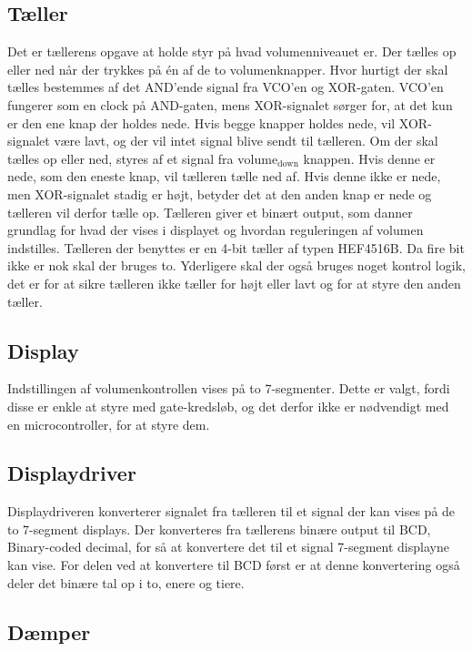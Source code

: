 \subsection*{Tæller}
\label{volumenkontrol-simulering-taeller}

Det er tællerens opgave at holde styr på hvad volumenniveauet er. Der tælles op eller ned når der trykkes på én af de to volumenknapper. Hvor hurtigt der skal tælles bestemmes af det AND'ende signal fra VCO'en og XOR-gaten. VCO'en fungerer som en clock på AND-gaten, mens XOR-signalet sørger for, at det kun er den ene knap der holdes nede. Hvis begge knapper holdes nede, vil XOR-signalet være lavt, og der vil intet signal blive sendt til tælleren. Om der skal tælles op eller ned, styres af et signal fra $\mathrm{volume_{down}}$ knappen. Hvis denne er nede, som den eneste knap, vil tælleren tælle ned af. Hvis denne ikke er nede, men XOR-signalet stadig er højt, betyder det at den anden knap er nede og tælleren vil derfor tælle op. Tælleren giver et binært output, som danner grundlag for hvad der vises i displayet og hvordan reguleringen af volumen indstilles. Tælleren der benyttes er en 4-bit tæller af typen HEF4516B. Da fire bit ikke er nok skal der bruges to. Yderligere skal der også bruges noget kontrol logik, det er for at sikre tælleren ikke tæller for højt eller lavt og for at styre den anden tæller.

\subsection*{Display}
\label{volumenkontrol-simulering-display}
Indstillingen af volumenkontrollen vises på to 7-segmenter. Dette er valgt, fordi disse er enkle at styre med gate-kredsløb, og det derfor ikke er nødvendigt med en microcontroller, for at styre dem. 

\subsection*{Displaydriver}
\label{volumenkontrol-simulering-display_driver}
Displaydriveren konverterer signalet fra tælleren til et signal der kan vises på de to 7-segment displays. Der konverteres fra tællerens binære output til BCD, Binary-coded decimal, for så at konvertere det til et signal 7-segment displayne kan vise. For delen ved at konvertere til BCD først er at denne konvertering også deler det binære tal op i to, enere og tiere. 

\subsection*{Dæmper}
\label{volumenkontrol-simulering-daemper}

